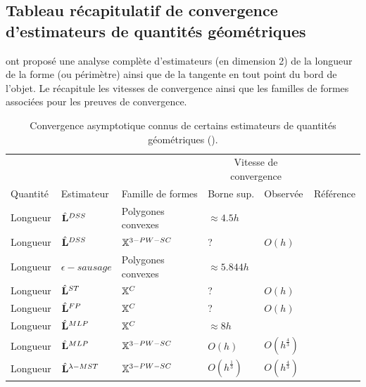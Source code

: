\subsection{Tableau récapitulatif de convergence d'estimateurs de quantités géométriques}
%
 ont proposé une analyse
complète d'estimateurs (en dimension 2) de la longueur de la forme (ou
périmètre) ainsi que de la tangente en tout point du bord de l'objet. Le
 récapitule les vitesses de convergence ainsi que les
familles de formes associées pour les preuves de convergence.


\begin{table}[ht]
\centering
\caption{Convergence asymptotique connus de certains estimateurs de quantités géométriques ().}
\label{tab:tang-comp}
\begin{tabular}{@{}lp{1.9cm}lllr@{}}
\toprule
 & & & \multicolumn{2}{c}{Vitesse de convergence} &            \\ \cmidrule(r){4-5}
Quantité & Estimateur & Famille de formes & Borne sup. & Observée & Référence \\ \midrule

%
Longueur & $\hat{\mathbf{L}}^{DSS}$ & Polygones convexes & $\approx 4.5h$ & & \cite{Kovalevsky1992} \\
Longueur & $\hat{\mathbf{L}}^{DSS}$ & $\mathbb{X}^{3-PW-SC}$ & ? & $O(h)$ & \cite{Kovalevsky1992} \\
Longueur & $\epsilon-sausage$ & Polygones convexes & $\approx 5.844h$ & & \cite{Asano2001} \\
Longueur & $\hat{\mathbf{L}}^{ST}$ & $\mathbb{X}^{C}$ & ? & $O(h)$ & \cite{Coeurjolly2004} \\
Longueur & $\hat{\mathbf{L}}^{FP}$ & $\mathbb{X}^{C}$ & ? & $O(h)$ & \cite{Roussillon2011b} \\
Longueur & $\hat{\mathbf{L}}^{MLP}$ & $\mathbb{X}^{C}$ & $\approx 8h$ & & \cite{Sloboda1998} \\
Longueur & $\hat{\mathbf{L}}^{MLP}$ & $\mathbb{X}^{3-PW-SC}$ & $O(h)$ & $O(h^\frac{4}{3})$ & \cite{Sloboda1998} \\
Longueur & $\hat{\mathbf{L}}^{\lambda-MST}$ & $\mathbb{X}^{3-PW-SC}$ & $O(h^\frac{1}{3})$ & $O(h^\frac{4}{3})$ & \cite{Lachaud2006HDR} \\


\end{tabular}
\end{table}
